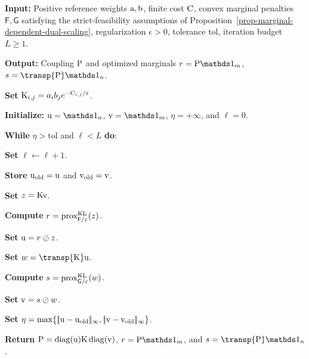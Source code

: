 \begin{alg}\label{alg-generalized-sinkhorn-marginal-penalties}
\textbf{Input:} Positive reference weights $\a,\b$, finite cost $\C$, convex marginal penalties $\mathsf F,\mathsf G$ satisfying the strict-feasibility assumptions of Proposition~\ref{prop-marginal-dependent-dual-scaling}, regularization $\epsilon>0$, tolerance $\mathrm{tol}$, iteration budget $L\geq1$.

\textbf{Output:} Coupling $\P$ and optimized marginals $r=\P\ones_m$, $s=\transp{\P}\ones_n$.

\textbf{Set} $\K_{i,j}=a_i b_j e^{-\C_{i,j}/\epsilon}$.

\textbf{Initialize:} $\uD=\ones_n$, $\vD=\ones_m$, $\eta=+\infty$, and $\ell=0$.

\textbf{While} $\eta>\mathrm{tol}$ and $\ell<L$ \textbf{do}:
\begin{algblock}
\textbf{Set} $\ell\leftarrow \ell+1$.

\textbf{Store} $\uD_{\mathrm{old}}=\uD$ and $\vD_{\mathrm{old}}=\vD$.

\textbf{Set} $z=\K\vD$.

\textbf{Compute} $r=\prox_{\mathsf F/\epsilon}^{\KLD}(z)$.

\textbf{Set} $\uD=r\oslash z$.

\textbf{Set} $w=\transp{\K}\uD$.

\textbf{Compute} $s=\prox_{\mathsf G/\epsilon}^{\KLD}(w)$.

\textbf{Set} $\vD=s\oslash w$.

\textbf{Set} $\eta=\max\{\norm{\uD-\uD_{\mathrm{old}}}_\infty,\norm{\vD-\vD_{\mathrm{old}}}_\infty\}$.
\end{algblock}
\algreturnskip
\textbf{Return} $\P=\diag(\uD)\K\diag(\vD)$, $r=\P\ones_m$, and $s=\transp{\P}\ones_n$.
\end{alg}

